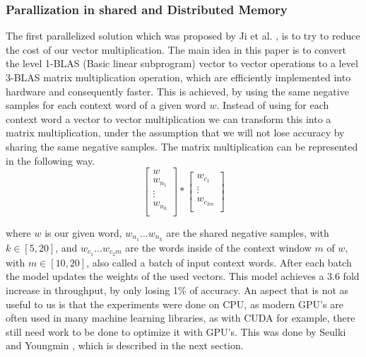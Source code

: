 \subsubsection{Parallization in shared and Distributed Memory}
The first parallelized solution which was proposed by Ji et al. \cite{intel}, is to try to reduce the cost of our vector multiplication. The main idea in this paper is to convert the level 1-BLAS (Basic linear subprogram) vector to vector operations to a level 3-BLAS matrix multiplication operation, which are efficiently implemented into hardware and consequently faster. This is achieved, by using the same negative samples for each context word of a given word $w$. Instead of using for each context word a vector to vector multiplication we can transform this into a matrix multiplication, under the assumption that we will not lose accuracy by sharing the same negative samples. The matrix multiplication can be represented in the following way.
\[
\begin{bmatrix}
w \\
w_{n_1} \\
\vdots \\
w_{n_k}\\
\end{bmatrix}
*
\begin{bmatrix}
w_{c_1}\\
\vdots\\
w_{c_{2m}}\\
\end{bmatrix}
\]

where $w$ is our given word, $w_{n_1}...w_{n_k}$ are the shared negative samples, with $k \in [5,20]$, and $w_{c_1}...w_{c_2m}$ are the words inside of the context window $m$ of $w$, with $m \in [10,20]$, also called a batch of input context words. After each batch the model updates the weights of the used vectors.
This model achieves a 3.6 fold increase in throughput, by only losing 1\% of accuracy. An aspect that is not as useful to us is that the experiments were done on CPU, as modern GPU's are often used in many machine learning libraries, as with CUDA for example, there still need work to be done to optimize it with GPU's. This was done by Seulki and Youngmin \cite{gpu}, which is described in the next section.

